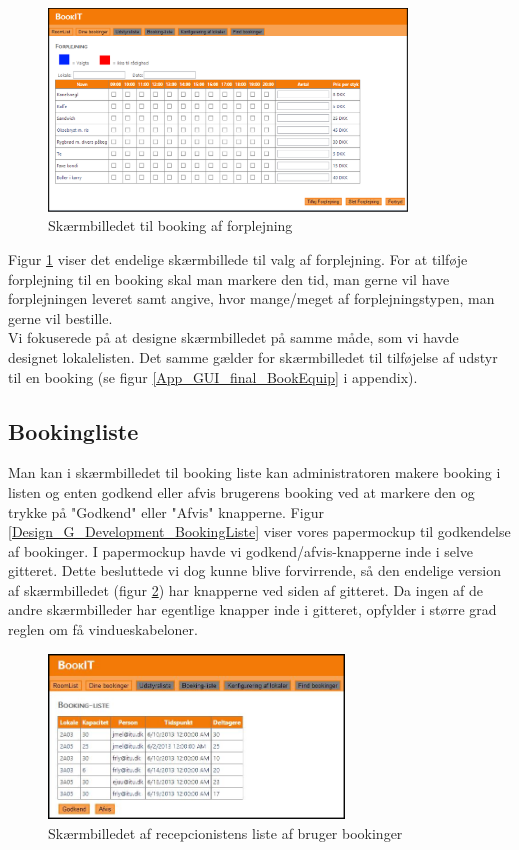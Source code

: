 \begin{figure}[h!]
  \centering
    \includegraphics[width=0.85\textwidth]{Appendix/GUI-Prototype/DigitalMockup/Forplejning}
  \caption{Skærmbilledet til booking af forplejning}
\label{Design_G_Development_Forplejning_Final}
\end{figure} 

Figur \ref{Design_G_Development_Forplejning_Final} viser det endelige skærmbillede til valg af forplejning. For at tilføje forplejning til en booking skal man markere den tid, man gerne vil have forplejningen leveret samt angive, hvor mange/meget af forplejningstypen, man gerne vil bestille.
\\Vi fokuserede på at designe skærmbilledet på samme måde, som vi havde designet lokalelisten. Det samme gælder for skærmbilledet til tilføjelse af udstyr til en booking (se figur \ref{App_GUI_final_BookEquip} i appendix).

\subsection{Bookingliste}
Man kan i skærmbilledet til booking liste kan administratoren makere booking i listen og enten godkend eller afvis brugerens booking ved at markere den og trykke på "Godkend" eller "Afvis" knapperne.
Figur \ref{Design_G_Development_BookingListe} viser vores papermockup til godkendelse af bookinger. 
I papermockup havde vi godkend/afvis-knapperne inde i selve gitteret. Dette besluttede vi dog kunne blive forvirrende, så den endelige version af skærmbilledet (figur \ref{Design_G_Development_BookingListe_Final}) har knapperne ved siden af gitteret. Da ingen af de andre skærmbilleder har egentlige knapper inde i gitteret, opfylder i større grad reglen om få vindueskabeloner.

\begin{figure}[h!]
  \centering
    \includegraphics[width=0.7\textwidth]{Appendix/GUI-Prototype/DigitalMockup/BookingListe}
  \caption{Skærmbilledet af recepcionistens liste af bruger bookinger}
\label{Design_G_Development_BookingListe_Final}
\end{figure} 

